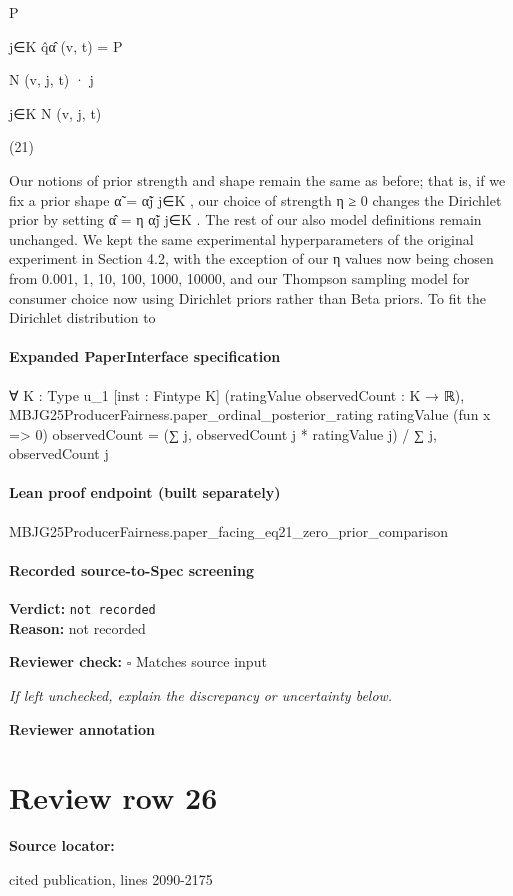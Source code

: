 \documentclass[10pt]{article}
\newcommand{\reviewerbox}{%
  \par\noindent\fbox{\parbox{0.96\linewidth}{\rule{0pt}{0.38in}}}\par
}
\newcommand{\reviewmatch}[1]{%
  \par\noindent\textbf{Reviewer check:} $\square$\; #1\par
  \noindent\emph{If left unchecked, explain the discrepancy or uncertainty below.}\par
}
\begin{document}
\begin{ReviewVerbatim}
P

j∈K
q̂α̂ (v, t) = P

N (v, j, t) · j

j∈K N (v, j, t)

(21)

Our notions of prior strength and shape remain the same
as before; that is, if we fix a prior shape α̃ = {α̃j }j∈K ,
our choice of strength η ≥ 0 changes the Dirichlet prior
by setting α̂ = {η α̃j }j∈K . The rest of our also model definitions remain unchanged. We kept the same experimental
hyperparameters of the original experiment in Section 4.2,
with the exception of our η values now being chosen from
{0.001, 1, 10, 100, 1000, 10000}, and our Thompson sampling model for consumer choice now using Dirichlet priors rather than Beta priors. To fit the Dirichlet distribution to
\end{ReviewVerbatim}


\paragraph{Expanded PaperInterface specification}
\begin{ReviewVerbatim}
∀ {K : Type u_1} [inst : Fintype K] (ratingValue observedCount : K → ℝ),
  MBJG25ProducerFairness.paper_ordinal_posterior_rating ratingValue (fun x => 0) observedCount =
    (∑ j, observedCount j * ratingValue j) / ∑ j, observedCount j
\end{ReviewVerbatim}

\paragraph{Lean proof endpoint (built separately)}\begin{ReviewVerbatim}
MBJG25ProducerFairness.paper_facing_eq21_zero_prior_comparison
\end{ReviewVerbatim}

\paragraph{Recorded source-to-Spec screening}
\textbf{Verdict:} \texttt{not recorded}
\\
\textbf{Reason:} not recorded
\reviewmatch{Matches source input}
\noindent\textbf{Reviewer annotation}\par
\reviewerbox
\clearpage
\hypertarget{source-claim-c0449d6c0ae69374}{}
\section*{Review row 26}
\textbf{Source locator:} {\footnotesize\raggedright cited publication, lines 2090-\allowbreak{}2175\par}
\end{document}
